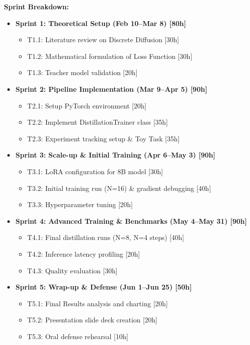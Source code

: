 \documentclass[11pt, a4paper]{article}
\begin{document}
\textbf{Sprint Breakdown:}
\begin{itemize}
    \item \textbf{Sprint 1: Theoretical Setup (Feb 10--Mar 8) [80h]}
    \begin{itemize}
        \item T1.1: Literature review on Discrete Diffusion [30h]
        \item T1.2: Mathematical formulation of Loss Function [30h]
        \item T1.3: Teacher model validation [20h]
    \end{itemize}
    \item \textbf{Sprint 2: Pipeline Implementation (Mar 9--Apr 5) [90h]}
    \begin{itemize}
        \item T2.1: Setup PyTorch environment [20h]
        \item T2.2: Implement DistillationTrainer class [35h]
        \item T2.3: Experiment tracking setup \& Toy Task [35h]
    \end{itemize}
    \item \textbf{Sprint 3: Scale-up \& Initial Training (Apr 6--May 3) [90h]}
    \begin{itemize}
        \item T3.1: LoRA configuration for 8B model [30h]
        \item T3.2: Initial training run (N=16) \& gradient debugging [40h]
        \item T3.3: Hyperparameter tuning [20h]
    \end{itemize}
    \item \textbf{Sprint 4: Advanced Training \& Benchmarks (May 4--May 31) [90h]}
    \begin{itemize}
        \item T4.1: Final distillation runs (N=8, N=4 steps) [40h]
        \item T4.2: Inference latency profiling [20h]
        \item T4.3: Quality evaluation [30h]
    \end{itemize}
    \item \textbf{Sprint 5: Wrap-up \& Defense (Jun 1--Jun 25) [50h]}
    \begin{itemize}
        \item T5.1: Final Results analysis and charting [20h]
        \item T5.2: Presentation slide deck creation [20h]
        \item T5.3: Oral defense rehearsal [10h]
    \end{itemize}
\end{itemize}
\end{document}
